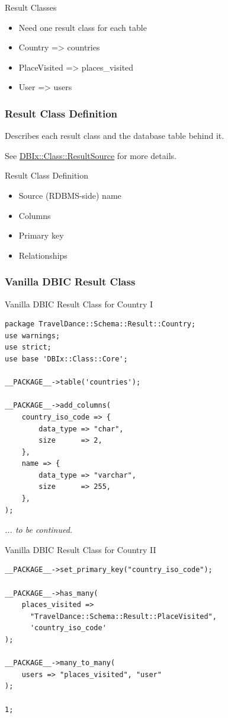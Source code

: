 \begin{frame}{Result Classes}
\begin{itemize}
\item Need one result class for each table
\item Country => countries
\item PlaceVisited => places\_visited
\item User => users
\end{itemize}
\end{frame}

\subsubsection{Result Class Definition}
Describes each result class and the database table behind it. 

See \href{https://metacpan.org/pod/DBIx::Class::ResultSource}{DBIx::Class::ResultSource} for more details.

\begin{frame}{Result Class Definition}

\begin{itemize}
\item Source (RDBMS-side) name
\item Columns
\item Primary key
\item Relationships
\end{itemize}
\end{frame}

\subsubsection{Vanilla DBIC Result Class}

\begin{frame}[fragile]{Vanilla DBIC Result Class for Country I}
\begin{lstlisting}
package TravelDance::Schema::Result::Country;
use warnings;
use strict;
use base 'DBIx::Class::Core';

__PACKAGE__->table('countries');

__PACKAGE__->add_columns(
    country_iso_code => {
        data_type => "char",
        size      => 2,
    },
    name => {
        data_type => "varchar",
        size      => 255,
    },
);
\end{lstlisting}
\textit{... to be continued.}
\end{frame}

\begin{frame}[fragile]{Vanilla DBIC Result Class for Country II}
\begin{lstlisting}
__PACKAGE__->set_primary_key("country_iso_code");

__PACKAGE__->has_many(
    places_visited =>
      "TravelDance::Schema::Result::PlaceVisited",
      'country_iso_code'
);

__PACKAGE__->many_to_many(
    users => "places_visited", "user"
);

1;
\end{lstlisting}
\end{frame}

